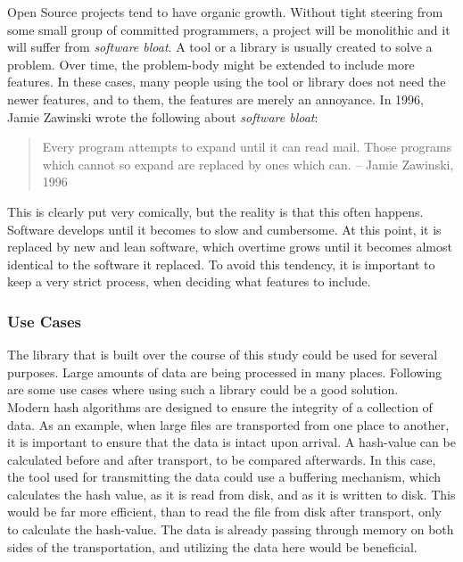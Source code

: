 \documentclass[a4paper]{article}
\begin{document}
Open Source projects tend to have organic growth. Without tight steering from some small group of committed programmers, a project will be monolithic and it will suffer from \textit{software bloat}. A tool or a library is usually created to solve a problem. Over time, the problem-body might be extended to include more features. In these cases, many people using the tool or library does not need the newer features, and to them, the features are merely an annoyance. In 1996, Jamie Zawinski wrote the following about \textit{software bloat}\cite{bloat}:

\begin{quotation}
  Every program attempts to expand until it can read mail. Those programs which cannot so expand are replaced by ones which can.
  -- Jamie Zawinski, 1996
\end{quotation}

This is clearly put very comically, but the reality is that this often happens. Software develops until it becomes to slow and cumbersome. At this point, it is replaced by new and lean software, which overtime grows until it becomes almost identical to the software it replaced. To avoid this tendency, it is important to keep a very strict process, when deciding what features to include.
    

\subsubsection{Use Cases}
The library that is built over the course of this study could be used for several purposes. Large amounts of data are being processed in many places. Following are some use cases where using such a library could be a good solution.\\

Modern hash algorithms are designed to ensure the integrity of a collection of data. As an example, when large files are transported from one place to another, it is important to ensure that the data is intact upon arrival. A hash-value can be calculated before and after transport, to be compared afterwards. In this case, the tool used for transmitting the data could use a buffering mechanism, which calculates the hash value, as it is read from disk, and as it is written to disk. This would be far more efficient, than to read the file from disk after transport, only to calculate the hash-value. The data is already passing through memory on both sides of the transportation, and utilizing the data here would be beneficial.\\
\end{document}
